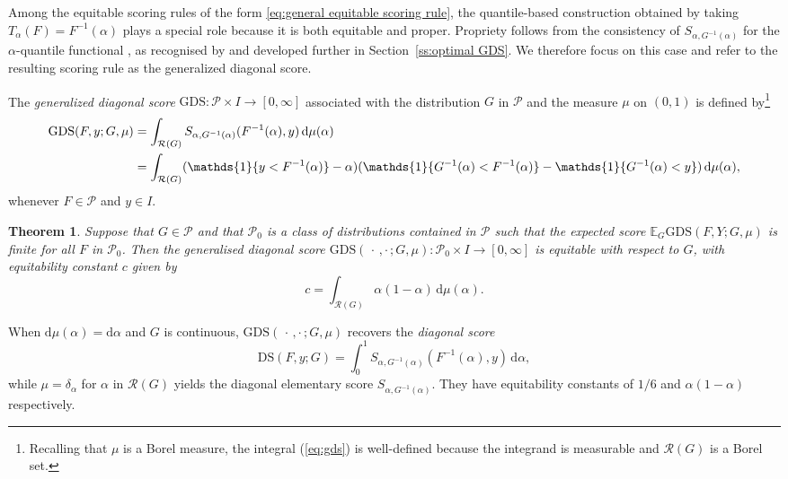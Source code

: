 \documentclass[10pt]{article} %
\theoremstyle{theorem}
\newtheorem{thm}{Theorem}
\theoremstyle{definition}
\newcommand{\EEE}{\mathbb{E}}
\newcommand{\dd}{\mathrm{d}}
\newcommand{\one}{\mathds{1}}
\newcommand{\GDS}{\mathrm{GDS}}
\newcommand{\RG}{\mathcal{R}(G)}
\newcommand{\twocdots}{\,\cdot\,,\cdot\,}
\begin{document}
Among the equitable scoring rules of the form \eqref{eq:general equitable scoring rule}, the quantile-based construction obtained by taking $T_\alpha(F)=F^{-1}(\alpha)$ plays a special role because it is both equitable and proper. Propriety follows from the consistency of $S_{\alpha,G^{-1}(\alpha)}$ for the $\alpha$-quantile functional \citep{ehm2016quantiles}, as recognised by \citet{ben2018diagonal} and developed further in Section~\ref{ss:optimal GDS}. We therefore focus on this case and refer to the resulting scoring rule as the generalized diagonal score.

The \textit{generalized diagonal score} $\GDS:\mathcal{P}\times I\to [0,\infty]$ associated with the distribution $G$ in $\mathcal{P}$ and the measure $\mu$ on $(0,1)$ is defined by\footnote{Recalling that $\mu$ is a Borel measure, the integral (\ref{eq:gds}) is well-defined because the integrand is measurable and $\RG$ is a Borel set.}
\begin{align}
\GDS(F,y;G,\mu)
&= \int_{\RG} S_{\alpha,G^{-1}(\alpha)}(F^{-1}(\alpha),y)\,\dd\mu(\alpha) \notag \\
&= \int_{\RG} (\one\{y<F^{-1}(\alpha)\} - \alpha)(\one\{G^{-1}(\alpha) < F^{-1}(\alpha)\} - \one\{G^{-1}(\alpha) < y\})\,\dd\mu(\alpha), \label{eq:gds}
\end{align}
whenever $F\in\mathcal{P}$ and $y\in I$.

\begin{thm}\label{thm:GDS is equitable}
Suppose that $G\in\mathcal{P}$ and that $\mathcal{P}_0$ is a class of distributions contained in $\mathcal{P}$ such that the expected score $\EEE_G \GDS(F,Y;G,\mu)$ is finite for all $F$ in $\mathcal{P}_0$. Then the generalised diagonal score $\GDS(\twocdots ; G,\mu):\mathcal{P}_0\times I \to[0,\infty]$ is equitable with respect to $G$, with equitability constant $c$ given by
\begin{equation}\label{eq:GDS equitability constant}
c=\int_{\RG}\alpha(1-\alpha)\,\dd\mu(\alpha).
\end{equation}
\end{thm}

When $\dd\mu(\alpha)=\dd\alpha$ and $G$ is continuous, $\GDS(\twocdots;G,\mu)$ recovers the \textit{diagonal score} \citep{ben2018diagonal}
\begin{equation}\label{eq:DS}
\mathrm{DS}(F,y;G)=\int_0^1 S_{\alpha,G^{-1}(\alpha)}(F^{-1}(\alpha),y) \,\dd\alpha,
\end{equation}
while $\mu=\delta_\alpha$ for $\alpha$ in $\RG$ yields the diagonal elementary score $S_{\alpha,G^{-1}(\alpha)}$. They have equitability constants of $1/6$ and $\alpha(1-\alpha)$ respectively. 
\end{document}
